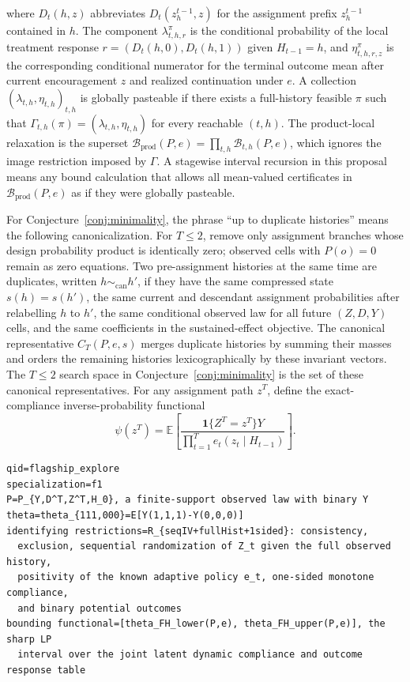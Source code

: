 \documentclass[11pt]{article}
\newcommand{\E}{\mathbb{E}}
\newcommand{\one}{\mathbf{1}}
\theoremstyle{definition}
\theoremstyle{plain}
\theoremstyle{remark}
\begin{document}
where \(D_t(h,z)\) abbreviates \(D_t(z_h^{t-1},z)\) for the assignment prefix \(z_h^{t-1}\) contained in \(h\).  The component \(\lambda^\pi_{t,h,r}\) is the conditional probability of the local treatment response \(r=(D_t(h,0),D_t(h,1))\) given \(H_{t-1}=h\), and \(\eta^\pi_{t,h,r,z}\) is the corresponding conditional numerator for the terminal outcome mean after current encouragement \(z\) and realized continuation under \(e\).  A collection \((\lambda_{t,h},\eta_{t,h})_{t,h}\) is globally pasteable if there exists a full-history feasible \(\pi\) such that \(\Gamma_{t,h}(\pi)=(\lambda_{t,h},\eta_{t,h})\) for every reachable \((t,h)\).  The product-local relaxation is the superset \(\mathcal{B}_{\mathrm{prod}}(P,e)=\prod_{t,h}\mathcal{B}_{t,h}(P,e)\), which ignores the image restriction imposed by \(\Gamma\).  A stagewise interval recursion in this proposal means any bound calculation that allows all mean-valued certificates in \(\mathcal{B}_{\mathrm{prod}}(P,e)\) as if they were globally pasteable.

For Conjecture~\ref{conj:minimality}, the phrase ``up to duplicate histories'' means the following canonicalization.  For \(T\le2\), remove only assignment branches whose design probability product is identically zero; observed cells with \(P(o)=0\) remain as zero equations.  Two pre-assignment histories at the same time are duplicates, written \(h\sim_{\mathrm{can}}h'\), if they have the same compressed state \(s(h)=s(h')\), the same current and descendant assignment probabilities after relabelling \(h\) to \(h'\), the same conditional observed law for all future \((Z,D,Y)\) cells, and the same coefficients in the sustained-effect objective.  The canonical representative \(C_T(P,e,s)\) merges duplicate histories by summing their masses and orders the remaining histories lexicographically by these invariant vectors.  The \(T\le2\) search space in Conjecture~\ref{conj:minimality} is the set of these canonical representatives.
For any assignment path \(z^T\), define the exact-compliance inverse-probability functional
\[
\psi(z^T)=
\E\left[
\frac{\one\{Z^T=z^T\}Y}
{\prod_{t=1}^T e_t(z_t\mid H_{t-1})}
\right].
\]

\begin{verbatim}
qid=flagship_explore
specialization=f1
P=P_{Y,D^T,Z^T,H_0}, a finite-support observed law with binary Y
theta=theta_{111,000}=E[Y(1,1,1)-Y(0,0,0)]
identifying restrictions=R_{seqIV+fullHist+1sided}: consistency,
  exclusion, sequential randomization of Z_t given the full observed history,
  positivity of the known adaptive policy e_t, one-sided monotone compliance,
  and binary potential outcomes
bounding functional=[theta_FH_lower(P,e), theta_FH_upper(P,e)], the sharp LP
  interval over the joint latent dynamic compliance and outcome response table
\end{verbatim}
\end{document}
